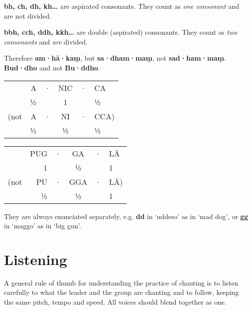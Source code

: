 \textbf{bh, ch, dh, kh\ldots} are aspirated consonants. They count as
\textit{one consonant} and are not divided.

\textbf{bbh, cch, ddh, kkh\ldots} are double (aspirated) consonants. They count as
\textit{two consonants} and \textit{are} divided.

Therefore \textbf{am·hā·kaṃ}, but \textbf{sa·dham·maṃ}, not \textbf{sad·ham·maṃ}.
\textbf{Bud·dho} and not \textbf{Bu·ddho}.

\begin{centering}

\begin{minipage}{0.8\linewidth}
\begin{multicols}{2}
\setlength{\tabcolsep}{1.8pt}%

\begin{tabular}{rrcccl}
     & A & · & NIC & · & CA   \\
     & ½ &   &  1  &   & ½    \\
(not & A & · & NI  & · & CCA) \\
     & ½ &   & ½   &   & ½    \\
\end{tabular}

\columnbreak

\begin{tabular}{rrcccl}
     & PUG & · & GA  & · & LĀ \\
     &  1  &   &  ½  &   &  1 \\
(not & PU  & · & GGA & · & LĀ)\\
     &  ½  &   &  ½  &   &  1 \\
\end{tabular}

\end{multicols}
\end{minipage}

\end{centering}

They are always enunciated separately, e.g. \textbf{dd} in ‘uddeso’ as
in ‘mad dog’, or \textbf{gg} in ‘maggo’ as in ‘big gun’.

\section{Listening}

A general rule of thumb for understanding the practice of chanting is to
listen carefully to what the leader and the group are chanting and to
follow, keeping the same pitch, tempo and speed. All voices should blend
together as one.

